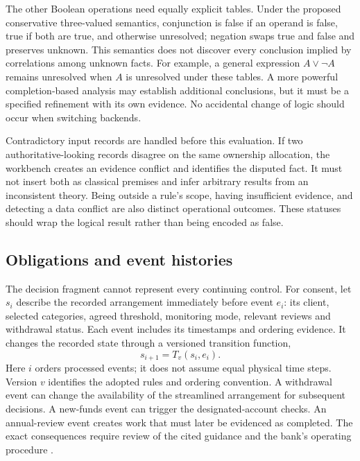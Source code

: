 The other Boolean operations need equally explicit tables. Under the proposed
conservative three-valued semantics, conjunction is false if an operand is false,
true if both are true, and otherwise unresolved; negation swaps true and false
and preserves unknown. This semantics does not discover every conclusion implied
by correlations among unknown facts. For example, a general expression
$A\lor\neg A$ remains unresolved when $A$ is unresolved under these tables.
A more powerful completion-based analysis may establish additional conclusions,
but it must be a specified refinement with its own evidence. No accidental
change of logic should occur when switching backends.

Contradictory input records are handled before this evaluation. If two
authoritative-looking records disagree on the same ownership allocation, the
workbench creates an evidence conflict and identifies the disputed fact. It must
not insert both as classical premises and infer arbitrary results from an
inconsistent theory. Being outside a rule's scope, having insufficient evidence,
and detecting a data conflict are also distinct operational outcomes. These
statuses should wrap the logical result rather than being encoded as false.

\subsection{Obligations and event histories}

The decision fragment cannot represent every continuing control. For consent,
let $s_i$ describe the recorded arrangement immediately before event $e_i$:
its client, selected categories, agreed threshold, monitoring mode, relevant
reviews and withdrawal status. Each event includes its timestamps and ordering
evidence. It changes the recorded state through a
versioned transition function,
\begin{equation}
 s_{i+1}=T_v(s_i,e_i).
 \label{eq:transition}
\end{equation}
Here $i$ orders processed events; it does not assume equal physical time
steps. Version $v$ identifies the adopted rules and ordering convention. A
withdrawal event can change the availability of the streamlined arrangement for
subsequent decisions. A new-funds event can trigger the designated-account
checks. An annual-review event creates work that must later be evidenced as
completed. The exact consequences require review of the cited guidance and the
bank's operating procedure \citep{sfcspiannex1,sfcspiannex2}.

